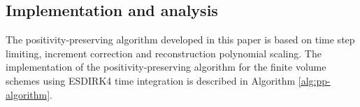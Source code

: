 %
%

\subsection{Implementation and analysis}

The positivity-preserving algorithm developed in this paper is based on time step limiting, increment correction and reconstruction polynomial scaling.
The implementation of the positivity-preserving algorithm for the finite volume schemes using ESDIRK4 time integration is described in Algorithm \ref{alg:pp-algorithm}. 


